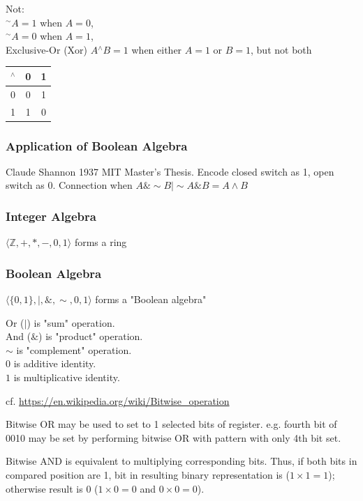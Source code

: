 \documentclass[10pt]{amsart}
\begin{document}
\begin{multicols*}{2}
Not: \\
${}^{\sim}A= 1$ when $A=0$, \\
${}^{\sim}A= 0$ when $A=1$, \\

Exclusive-Or (Xor)
$A {}^{\wedge} B = 1$ when either $A=1$ or $B=1$, but not both

\begin{center}
	\begin{tabular}{ l | c  c }
		${}^{\wedge}$ & 0 & 1 \\ \hline 
		0 & 0 & 1 \\
		1 & 1 & 0
	\end{tabular}
\end{center}

\subsubsection{Application of Boolean Algebra}

Claude Shannon 1937 MIT Master's Thesis. Encode closed switch as 1, open switch as 0. Connection when $A\& \sim B | \sim A \& B = A \wedge B$

\subsubsection{Integer Algebra}

$\langle \mathbb{Z}, +, *, - , 0 , 1 \rangle$ forms a ring

\subsubsection{Boolean Algebra}

$\langle \lbrace 0, 1 \rbrace , |, \& , \sim, 0, 1 \rangle $ forms a "Boolean algebra"

Or ($|$) is "sum" operation. \\
And ($\&$) is "product" operation. \\
$\sim$ is "complement" operation. \\
$0$ is additive identity. \\
$1$ is multiplicative identity.

cf. \url{https://en.wikipedia.org/wiki/Bitwise_operation}

Bitwise OR may be used to set to 1 selected bits of register. e.g. fourth bit of 0010 may be set by performing bitwise OR with pattern with only 4th bit set.

Bitwise AND is equivalent to multiplying corresponding bits. Thus, if both bits in compared position are 1, bit in resulting binary representation is ($1 \times 1 = 1$); otherwise result is 0 ($1 \times 0 = 0$ and $0 \times 0 = 0$).


\end{multicols*}
\end{document}
